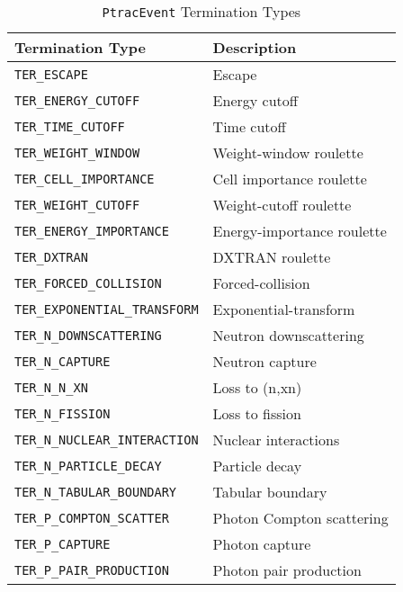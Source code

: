 \documentclass[11pt]{article}
\begin{document}
\begin{table}[]
  \begin{center}
  \caption{\texttt{PtracEvent} Termination Types}
  \label{tab:ptracevent_termination_types}
    \begin{tabular}{lp{3.5in}}
      \toprule
        Termination Type & Description \\
      \midrule
        \texttt{TER\_ESCAPE}                        & Escape \\
        \texttt{TER\_ENERGY\_CUTOFF}                & Energy cutoff \\
        \texttt{TER\_TIME\_CUTOFF}                  & Time cutoff \\
        \texttt{TER\_WEIGHT\_WINDOW}                & Weight-window roulette \\
        \texttt{TER\_CELL\_IMPORTANCE}              & Cell importance roulette \\
        \texttt{TER\_WEIGHT\_CUTOFF}                & Weight-cutoff roulette \\
        \texttt{TER\_ENERGY\_IMPORTANCE}            & Energy-importance roulette \\
        \texttt{TER\_DXTRAN}                        & DXTRAN roulette \\
        \texttt{TER\_FORCED\_COLLISION}             & Forced-collision \\
        \texttt{TER\_EXPONENTIAL\_TRANSFORM}        & Exponential-transform \\
        \texttt{TER\_N\_DOWNSCATTERING}             & Neutron downscattering \\
        \texttt{TER\_N\_CAPTURE}                    & Neutron capture \\
        \texttt{TER\_N\_N\_XN}                      & Loss to (n,xn) \\
        \texttt{TER\_N\_FISSION}                    & Loss to fission \\
        \texttt{TER\_N\_NUCLEAR\_INTERACTION}       & Nuclear interactions \\
        \texttt{TER\_N\_PARTICLE\_DECAY}            & Particle decay \\
        \texttt{TER\_N\_TABULAR\_BOUNDARY}          & Tabular boundary \\
        \texttt{TER\_P\_COMPTON\_SCATTER}           & Photon Compton scattering \\
        \texttt{TER\_P\_CAPTURE}                    & Photon capture \\
        \texttt{TER\_P\_PAIR\_PRODUCTION}           & Photon pair production \\

\end{tabular}
\end{center}
\end{table}
\end{document}
